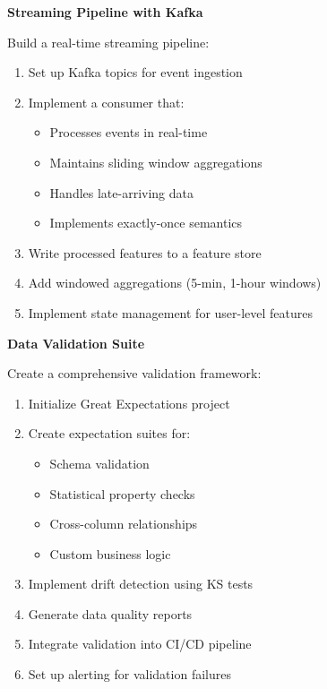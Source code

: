 \begin{exercise}
\textbf{Streaming Pipeline with Kafka}

Build a real-time streaming pipeline:

\begin{enumerate}
    \item Set up Kafka topics for event ingestion
    \item Implement a consumer that:
    \begin{itemize}
        \item Processes events in real-time
        \item Maintains sliding window aggregations
        \item Handles late-arriving data
        \item Implements exactly-once semantics
    \end{itemize}
    \item Write processed features to a feature store
    \item Add windowed aggregations (5-min, 1-hour windows)
    \item Implement state management for user-level features
\end{enumerate}
\end{exercise}

\begin{exercise}
\textbf{Data Validation Suite}

Create a comprehensive validation framework:

\begin{enumerate}
    \item Initialize Great Expectations project
    \item Create expectation suites for:
    \begin{itemize}
        \item Schema validation
        \item Statistical property checks
        \item Cross-column relationships
        \item Custom business logic
    \end{itemize}
    \item Implement drift detection using KS tests
    \item Generate data quality reports
    \item Integrate validation into CI/CD pipeline
    \item Set up alerting for validation failures
\end{enumerate}
\end{exercise}

